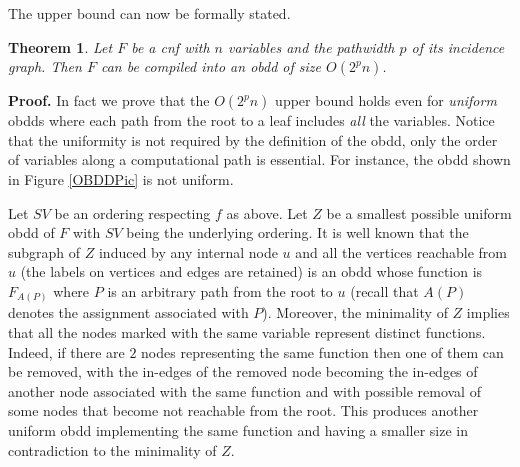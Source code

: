 \documentclass{article}
\newtheorem{theorem}{Theorem}
\begin{document}
The upper bound can now be formally stated. 

\begin{theorem}
Let $F$ be a {\sc cnf} with $n$ variables and the pathwidth $p$ of its incidence graph. 
Then $F$ can be compiled into an {\sc obdd} of size $O(2^pn)$. 
\end{theorem}

{\bf Proof.}
In fact we prove that the $O(2^pn)$ upper bound holds even for \emph{uniform} {\sc obdd}s
where each path from the root to a leaf includes \emph{all} the variables. 
Notice that the uniformity is not required by the definition of the {\sc obdd}, only
the order of variables along a computational path is essential. For instance, the {\sc obdd}
shown in Figure \ref{OBDDPic} is not uniform. 

Let $SV$ be an ordering respecting $f$ as above. Let $Z$ be a smallest possible uniform {\sc obdd} of $F$ 
with $SV$ being the underlying ordering.  It is well known that the subgraph of $Z$ induced by any internal node $u$
and all the vertices reachable from $u$ (the labels on vertices and edges are retained) is an {\sc obdd}
whose function is $F_{A(P)}$ where $P$ is an arbitrary path from the root to $u$ 
(recall that $A(P)$ denotes the assignment associated with $P$). 
Moreover, the minimality of $Z$ implies that all the nodes marked with the same variable represent distinct functions.
Indeed, if there are $2$ nodes representing the same function then one of them can be removed, with the
in-edges of the removed node becoming the in-edges of another node associated with the same function and with possible
removal of some nodes that become not reachable from the root. This produces another uniform {\sc obdd} implementing
the same function and having a smaller size in contradiction to the minimality of $Z$.

\begin{comment}
If for each variable $X$ the number of nodes labeled by
$X$ is at most $2^{p+1}+1$ then we are done. Otherwise, let $X$ be a variable such that there are
more than $2^{p+1}+1$ nodes labeled with $X$. Let $SV_1$ be the prefix of $SV$ including all
the variables occurring before $X$. Assume that the prefix is nonempty. Then, as described
in the Preliminaries section, for each node $u$ labeled with $X$ there is an assignment $S$ to $SV_1$
such that the subgraph of $Z$ reachable from $u$ is an {\sc obdd} realizing function $F_S$. 
Since the number of nodes labeled with $X$ is above $2^{p+1}+1$ and the number of the respective functions
is at most $2^{p+1}+1$ according to Lemma \ref{layersize}, there are two nodes $u$ and $v$ labeled with $X$
such that the subgraphs rooted by them realize the same function. It follows that $u$ and $v$ can be
contracted into a single node producing an {\sc obdd} smaller than $Z$ in contradiction to its minimality.
If $X$ is the first variables then there is only one node labeled with $X$, namely the root.

Since there are $n$ variables, the number of nodes labeled with variables is at most $(2^{p+1}+1)n$ and 
thus (taking into account that the rest of nodes are just $2$ leaves), the claimed upper bound holds.
\end{comment}
\end{document}
